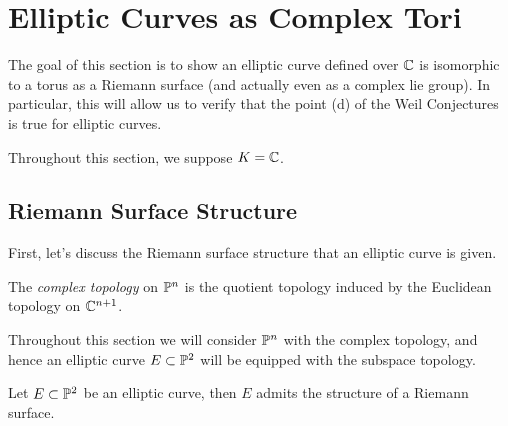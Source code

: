 \section{Elliptic Curves as Complex Tori}
\label{sec:over-C}

The goal of this section is to show an elliptic curve defined over $\mathbb{C}$
is isomorphic to a torus as a Riemann surface (and actually even 
as a complex lie group). In particular,
this will allow us to
verify that the point (d) of the Weil Conjectures is true for elliptic curves.

Throughout this section, we suppose $K = \mathbb{C}$.

\subsection{Riemann Surface Structure}

First, let's discuss the Riemann surface structure that an elliptic curve 
is given.

\begin{definition}
	The \emph{complex topology} on $\mathbb{P}^n$ is the quotient topology induced
	by the Euclidean topology on $\mathbb{C}^{n+1}$.
\end{definition}

Throughout this section we will consider $\mathbb{P}^n$ with the complex topology,
and hence an elliptic curve $E \subset \mathbb{P}^2$ will be equipped with
the subspace topology.

\begin{proposition}
	\label{prop:riemann-surf-struct}
	Let $E \subset \mathbb{P}^2$ be an elliptic curve, then $E$ admits
	the structure of a Riemann surface.
\end{proposition}

